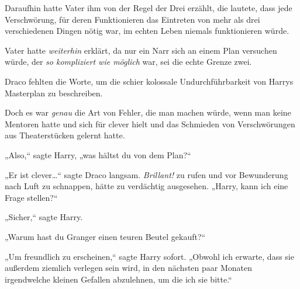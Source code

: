 Daraufhin hatte Vater ihm von der Regel der Drei erzählt, die lautete, dass jede Verschwörung, für deren Funktionieren das Eintreten von mehr als drei verschiedenen Dingen nötig war, im echten Leben niemals funktionieren würde.

Vater hatte \emph{weiterhin} erklärt, da nur ein Narr sich an einem Plan versuchen würde, der \emph{so kompliziert wie möglich} war, sei die echte Grenze zwei.

Draco fehlten die Worte, um die schier kolossale Undurchführbarkeit von Harrys Masterplan zu beschreiben.

Doch es war \emph{genau} die Art von Fehler, die man machen würde, wenn man keine Mentoren hatte und sich für clever hielt und das Schmieden von Verschwörungen aus Theaterstücken gelernt hatte.

„Also,“ sagte Harry, „was hältst du von dem Plan?“

„Er ist clever…“ sagte Draco langsam. \emph{Brillant!} zu rufen und vor Bewunderung nach Luft zu schnappen, hätte zu verdächtig ausgesehen. „Harry, kann ich eine Frage stellen?“

„Sicher,“ sagte Harry.

„Warum hast du Granger einen teuren Beutel gekauft?“

„Um freundlich zu erscheinen,“ sagte Harry sofort. „Obwohl ich erwarte, dass sie außerdem ziemlich verlegen sein wird, in den nächsten paar Monaten irgendwelche kleinen Gefallen abzulehnen, um die ich sie bitte.“

